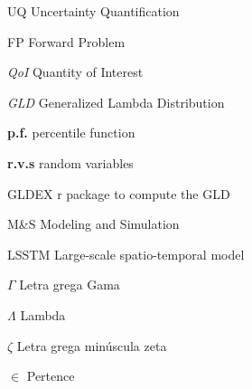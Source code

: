 \documentclass[
	12pt,				%
	openright,			%
	oneside,			%
	a4paper,			%
	sumario=tradicional,%
	brazil,			%
	french,				%
	spanish,			%
	english				%
	]{abntex2}
\theoremstyle{plain}
\theoremstyle{definition}
\begin{document}
%

%

\listoffigures*
\cleardoublepage

\listoftables*
\cleardoublepage

\begin{siglas}
  \item[UQ] Uncertainty Quantification
  \item[FP] Forward Problem
  \item[\textit{QoI}] Quantity of Interest
  \item[\textit{GLD}] Generalized Lambda Distribution
  \item[\textbf{p.f.}] percentile function
  \item[\textbf{r.v.s}] random variables
  \item[GLDEX] r package to compute the GLD 
  \item[M\&S] Modeling and Simulation
  \item[LSSTM] Large-scale spatio-temporal model
\end{siglas}

\begin{simbolos}
  \item[$ \Gamma $] Letra grega Gama
  \item[$ \Lambda $] Lambda
  \item[$ \zeta $] Letra grega minúscula zeta
  \item[$ \in $] Pertence
\end{simbolos}
\end{document}
